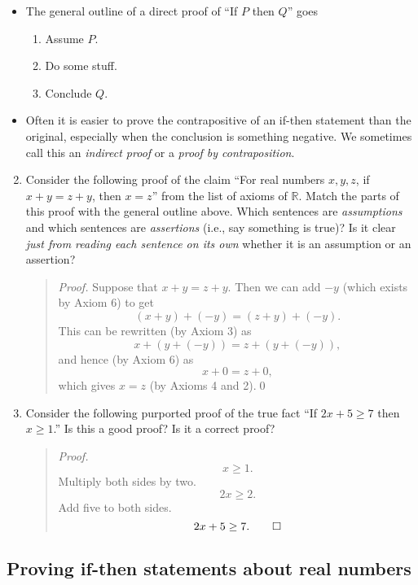 \documentclass[12pt]{amsart}
\newcommand{\R}{\mathbb{R}}
\begin{document}
\begin{framed}
\begin{itemize}
\item The general outline of a direct proof of ``If $P$ then $Q$'' goes
\begin{enumerate}
\item Assume $P$.
\item Do some stuff.
\item Conclude $Q$.
\end{enumerate}
\item Often it is easier to prove the contrapositive of an if-then statement than the original, especially when the conclusion is something negative. We sometimes call this an \emph{indirect proof} or a \emph{proof by contraposition}.
\end{itemize}

\end{framed}

\begin{enumerate}\setcounter{enumi}{1}
\item Consider the following proof of the claim ``For real numbers $x,y,z$, if $x+y=z+y$, then $x=z$'' from the list of axioms of $\R$. Match the parts of this proof with the general outline above. Which sentences are \emph{assumptions} and which sentences are \emph{assertions} (i.e., say something is true)? Is it clear \emph{just from reading each sentence on its own} whether it is an assumption or an assertion?
\begin{quote}
\emph{Proof.} Suppose that $x+y=z+y$. Then we can add $-y$ (which exists by Axiom 6) to get 
\[(x+y)+ (-y) = (z+y) + (-y).\]
This can be rewritten (by Axiom 3) as
\[x+ (y+ (-y) )= z+ (y + (-y)),\]
and hence (by Axiom 6) as
\[ x+ 0 = z+0,\]
which gives $x=z$ (by Axioms 4 and 2).\qed
\end{quote}



\item Consider the following purported proof of the true fact ``If $2x + 5 \geq 7$ then $x\geq 1$.'' Is this a good proof? Is it a correct proof?
\begin{quote}
\emph{Proof.}
\[ x \geq 1.\]
Multiply both sides by two.
\[ 2x \geq 2.\]
Add five to both sides.
\[2x+5 \geq 7. \qed\]
\end{quote}
\end{enumerate}


\subsection*{Proving if-then statements about real numbers}
\end{document}
